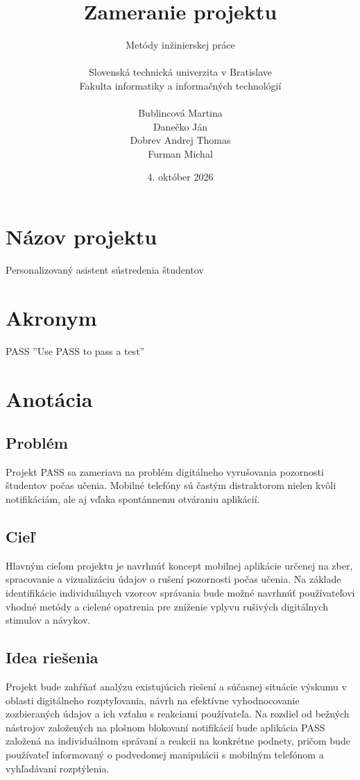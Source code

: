 \documentclass[11pt,a4paper,slovak]{article}
\title{Zameranie projektu}
\author{
{\small Metódy inžinierskej práce}\\
\\
{\small Slovenská technická univerzita v Bratislave}\\
{\small Fakulta informatiky a informačných technológií}\\
\\
{\small Bublincová Martina}\\
{\small Danečko Ján}\\
{\small Dobrev Andrej Thomas}\\
{\small Furman Michal}
}
\date{\small 4. október 2026}
\begin{document}
\pagestyle{empty}

\maketitle
\thispagestyle{empty}


\newpage


\section{Názov projektu}

Personalizovaný asistent sústredenia študentov



\section{Akronym} 
PASS
\newline
\newline
''Use PASS to pass a test''

\section{Anotácia} 

\subsection*{Problém}
Projekt PASS sa zameriava na problém digitálneho vyrušovania pozornosti študentov počas učenia.
Mobilné telefóny sú častým distraktorom nielen kvôli notifikáciám, ale aj vďaka spontánnemu otváraniu aplikácií.  

\subsection*{Cieľ}
Hlavným cieľom projektu je navrhnúť koncept mobilnej aplikácie určenej na zber, spracovanie a vizualizáciu údajov o rušení pozornosti počas učenia.
Na základe identifikácie individuálnych vzorcov správania bude možné navrhnúť používateľovi vhodné metódy a  cielené opatrenia pre zníženie vplyvu rušivých digitálnych stimulov a návykov.  

\subsection*{Idea riešenia}
Projekt bude zahŕňať analýzu existujúcich riešení a súčasnej situácie výskumu v oblasti digitálneho rozptyľovania, návrh na efektívne vyhodnocovanie zozbieraných údajov a ich vzťahu s reakciami používateľa.
Na rozdiel od bežných nástrojov založených na plošnom blokovaní notifikácií bude aplikácia PASS založená na individuálnom správaní a reakcii na konkrétne podnety, pričom bude používateľ informovaný o podvedomej manipulácii s mobilným telefónom a vyhľadávaní rozptýlenia.   
\end{document}
